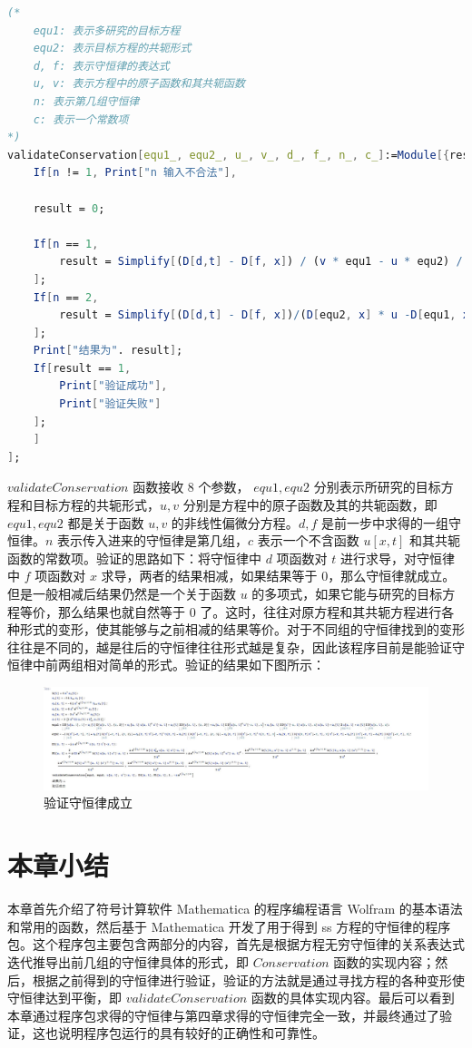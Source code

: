 \begin{lstlisting}[language=Mathematica,caption=验证守恒律]
(*
	equ1: 表示多研究的目标方程
	equ2: 表示目标方程的共轭形式
	d, f: 表示守恒律的表达式
	u, v: 表示方程中的原子函数和其共轭函数
	n: 表示第几组守恒律
	c: 表示一个常数项
*)
validateConservation[equ1_, equ2_, u_, v_, d_, f_, n_, c_]:=Module[{result, m},
	If[n != 1, Print["n 输入不合法"],
	
	result = 0;

	If[n == 1,
		result = Simplify[(D[d,t] - D[f, x]) / (v * equ1 - u * equ2) / c];
	];
	If[n == 2,
		result = Simplify[(D[d,t] - D[f, x])/(D[equ2, x] * u -D[equ1, x] * v + D[v, x] * equ1 + D[u, x] * equ2) / c];
	];
	Print["结果为". result];
	If[result == 1,
		Print["验证成功"],
		Print["验证失败"]
	];
	]
];
\end{lstlisting}
$validateConservation$ 函数接收 8 个参数， $equ1, equ2$ 分别表示所研究的目标方程和目标方程的共轭形式，$u, v$ 分别是方程中的原子函数及其的共轭函数，即 $equ1, equ2$ 都是关于函数 $u, v$ 的非线性偏微分方程。$d, f$ 是前一步中求得的一组守恒律。$n$ 表示传入进来的守恒律是第几组，$c$ 表示一个不含函数 $u[x,t]$ 和其共轭函数的常数项。验证的思路如下：将守恒律中 $d$ 项函数对 $t$ 进行求导，对守恒律中 $f$ 项函数对 $x$ 求导，两者的结果相减，如果结果等于 0，那么守恒律就成立。但是一般相减后结果仍然是一个关于函数 $u$ 的多项式，如果它能与研究的目标方程等价，那么结果也就自然等于 0 了。这时，往往对原方程和其共轭方程进行各种形式的变形，使其能够与之前相减的结果等价。对于不同组的守恒律找到的变形往往是不同的，越是往后的守恒律往往形式越是复杂，因此该程序目前是能验证守恒律中前两组相对简单的形式。验证的结果如下图所示：
\begin{figure}[!htp]
	\centering
	\includegraphics[width=\linewidth]{validateConservation.jpg}
	\caption{验证守恒律成立}
	\label{picture-5-3}
\end{figure}

\section{本章小结}
本章首先介绍了符号计算软件 Mathematica 的程序编程语言 Wolfram 的基本语法和常用的函数，然后基于 Mathematica 开发了用于得到 ss 方程的守恒律的程序包。这个程序包主要包含两部分的内容，首先是根据方程无穷守恒律的关系表达式迭代推导出前几组的守恒律具体的形式，即 $Conservation$ 函数的实现内容；然后，根据之前得到的守恒律进行验证，验证的方法就是通过寻找方程的各种变形使守恒律达到平衡，即 $validateConservation$ 函数的具体实现内容。最后可以看到本章通过程序包求得的守恒律与第四章求得的守恒律完全一致，并最终通过了验证，这也说明程序包运行的具有较好的正确性和可靠性。



